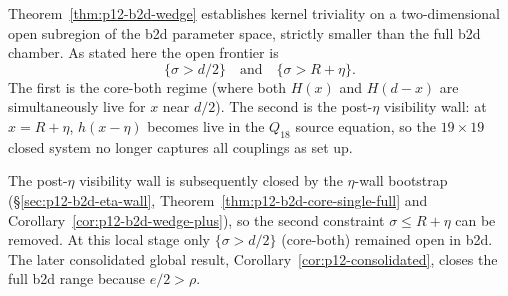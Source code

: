 \begin{remark}
\label{rem:p12-b2d-wedge-scope}
Theorem~\ref{thm:p12-b2d-wedge} establishes kernel triviality on
a two-dimensional open subregion of the b2d parameter space,
strictly smaller than the full b2d chamber.  As stated here the
open frontier is
\[
\{\sigma > d/2\} \quad\text{and}\quad \{\sigma > R + \eta\}.
\]
The first is the core-both regime (where both $H(x)$ and
$H(d - x)$ are simultaneously live for $x$ near $d/2$).
The second is the post-$\eta$ visibility wall: at $x = R + \eta$,
$h(x - \eta)$ becomes live in the $Q_{18}$ source equation, so
the $19 \times 19$ closed system no longer captures all couplings
as set up.

The post-$\eta$ visibility wall is subsequently closed by the
$\eta$-wall bootstrap (\S\ref{sec:p12-b2d-eta-wall},
Theorem~\ref{thm:p12-b2d-core-single-full} and
Corollary~\ref{cor:p12-b2d-wedge-plus}), so the second constraint
$\sigma \le R + \eta$ can be removed.  At this local stage only
$\{\sigma > d/2\}$ (core-both) remained open in b2d.  The later
consolidated global result, Corollary~\ref{cor:p12-consolidated}, closes
the full b2d range because $e/2>\rho$.
\end{remark}
